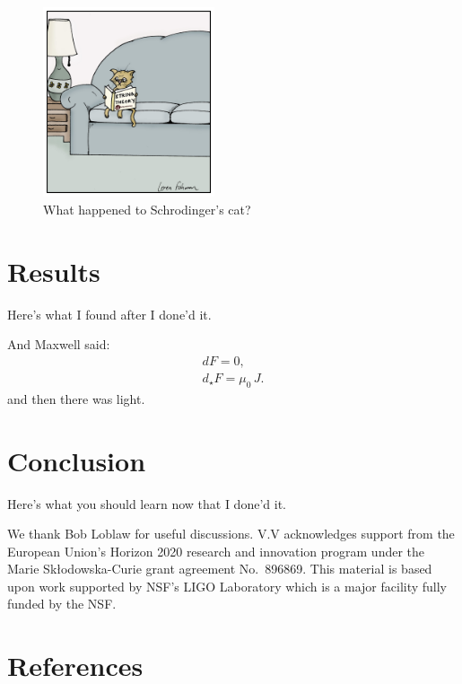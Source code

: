 \documentclass[aps,prd,amsmath,floats,floatfix, twocolumn,
superscriptaddress,nofootinbib,showpacs,longbibliography]{revtex4-1}
\begin{document}
\begin{figure}[thb]
\includegraphics[width=0.45\textwidth]{string_cat.jpeg}
\caption{
What happened to Schrodinger's cat?
}
\label{fig:strings}
\end{figure}

\section{Results}
\label{sec:results}
Here's what I found after I done'd it.

And Maxwell said:
\begin{gather}
    dF = 0, \\
    d_{\star}F = \mu_0 \, J.
\label{eq:doppler_mass}
\end{gather}
and then there was light.


\section{Conclusion}
\label{sec:conclusion}
Here's what you should learn now that I done'd it.


\begin{acknowledgments}
We thank Bob Loblaw for useful discussions.
V.V acknowledges support from the European Union’s Horizon 2020 research and
innovation program under the Marie Skłodowska-Curie grant agreement No.~896869.
This material is based upon work supported by NSF's LIGO Laboratory which is a
major facility fully funded by the NSF.
\end{acknowledgments}

\section*{References}

\end{document}
